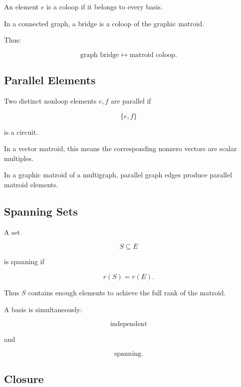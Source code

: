 An element \(e\) is a coloop if it belongs to every basis.

In a connected graph, a bridge is a coloop of the graphic matroid.

Thus:

\[
\boxed{
\text{graph bridge}
\longleftrightarrow
\text{matroid coloop}.
}
\]

\subsection{Parallel Elements}
\label{subsec:parallel-elements-matroid}

Two distinct nonloop elements \(e,f\) are parallel if

\[
\{e,f\}
\]

is a circuit.

In a vector matroid, this means the corresponding nonzero vectors are
scalar multiples.

In a graphic matroid of a multigraph, parallel graph edges produce
parallel matroid elements.

\subsection{Spanning Sets}
\label{subsec:matroid-spanning}

A set

\[
S\subseteq E
\]

is spanning if

\[
\boxed{
r(S)=r(E).
}
\]

Thus \(S\) contains enough elements to achieve the full rank of the
matroid.

A basis is simultaneously:

\[
\boxed{
\text{independent}
}
\]

and

\[
\boxed{
\text{spanning}.
}
\]

\subsection{Closure}
\label{subsec:matroid-closure}

